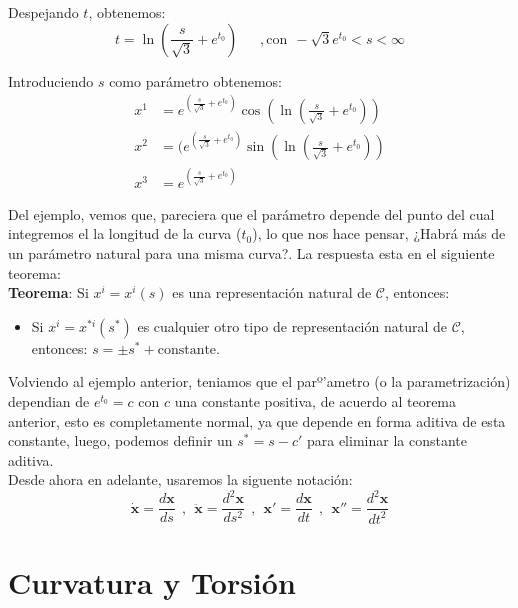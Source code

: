 \documentclass[letterpaper,11pt,twoside]{report}
\begin{document}
Despejando $t$, obtenemos:
	\begin{equation*}
		t = \ln \left(\frac{s}{\sqrt{3}}+e^{t_{0}} \right) \ \ \ \ \ \ \ , \text{con} \ \  -\sqrt{3}e^{t_{0}} < s < \infty
	\end{equation*}

Introduciendo $s$ como par\'ametro obtenemos:
	\begin{align*}
		x^{1} &= e^{ \left( \frac{s}{\sqrt{3}}+e^{t_{0}} \right) } \cos \left( \ln \left( \frac{s}{\sqrt{3}}+e^{t_{0}} \right) \right) \\
		x^{2} &= ( e^{ \left( \frac{s}{\sqrt{3}}+e^{t_{0}} \right)}	\sin\left(\ln \left(\frac{s}{\sqrt{3}}+e^{t_{0}} \right) \right)  \\
		x^{3} &= e^{ \left(\frac{s}{\sqrt{3}}+e^{t_{0}} \right) }
	\end{align*}

Del ejemplo, vemos que, pareciera que el par\'ametro depende del punto del cual integremos el la longitud de la curva ($t_{0}$), lo que nos 
hace pensar, ¿Habr\'a m\'as de un par\'ametro natural para una misma curva?. La respuesta esta en el siguiente teorema:\\

\textbf{Teorema}: Si $x^{i} = x^{i}(s)$ es una representaci\'on natural de $\mathcal{C}$, entonces: 
	\begin{itemize}
		\item Si $x^{i} = x^{*i}(s^{*})$ es cualquier otro tipo de representaci\'on natural de $\mathcal{C}$, entonces: $s = \pm s^{*} + \text{constante}$.
	\end{itemize}
	
Volviendo al ejemplo anterior, teniamos que el parº'ametro (o la parametrizaci\'on) dependian de $e^{t_{0}} = c$ con $c$ una constante 
positiva, de acuerdo al teorema anterior, esto es completamente normal, ya que depende en forma aditiva de esta constante, luego, podemos definir 
un $s^{*} = s - c' $ para eliminar la constante aditiva.  \\

Desde ahora en adelante, usaremos la siguente notaci\'on:
	\begin{equation*}
		\dot{\textbf{x}} = \frac{d\textbf{x}}{ds} \ \  , \ \ \ddot{\textbf{x}} = \frac{d^{2}\textbf{x}}{ds^{2}}\ \ , \ \ 
		\textbf{x}' = \frac{d\textbf{x}}{dt}\ \ , \ \ \textbf{x}'' = \frac{d^{2}\textbf{x}}{dt^{2}}
	\end{equation*}
	
\section{Curvatura y Torsi\'on}
\end{document}

